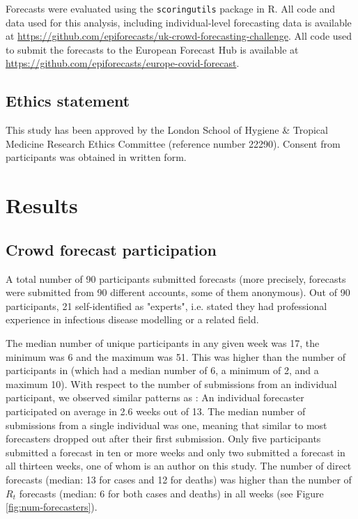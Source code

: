 \documentclass[10pt,a4paper,twocolumn]{article}
\begin{document}
Forecasts were evaluated using the \texttt{scoringutils} \citep{bosseEvaluatingForecastsScoringutils2022} package in \textsf{R}. All code and data used for this analysis, including individual-level forecasting data is available at \url{https://github.com/epiforecasts/uk-crowd-forecasting-challenge}. All code used to submit the forecasts to the European Forecast Hub is available at \url{https://github.com/epiforecasts/europe-covid-forecast}. 

\subsection*{Ethics statement}
This study has been approved by the London School of Hygiene \& Tropical Medicine Research Ethics Committee (reference number 22290). Consent from participants was obtained in written form.



\section*{Results}

\subsection*{Crowd forecast participation}

A total number of 90 participants submitted forecasts (more precisely, forecasts were submitted from 90 different accounts, some of them anonymous). Out of 90 participants, 21 self-identified as "experts", i.e. stated they had professional experience in infectious disease modelling or a related field. 

The median number of unique participants in any given week was 17, the minimum was 6 and the maximum was 51. This was higher than the number of participants in \cite{bosseComparingHumanModelbased2022} (which had a median number of 6, a minimum of 2, and a maximum 10). With respect to the number of submissions from an individual participant, we observed similar patterns as \cite{bosseComparingHumanModelbased2022}: An individual forecaster participated on average in 2.6 weeks out of 13. The median number of submissions from a single individual was one, meaning that similar to \citep{bosseComparingHumanModelbased2022} most forecasters dropped out after their first submission. Only five participants submitted a forecast in ten or more weeks and only two submitted a forecast in all thirteen weeks, one of whom is an author on this study. The number of direct forecasts (median: 13 for cases and 12 for deaths) was higher than the number of $R_t$ forecasts (median: 6 for both cases and deaths) in all weeks (see Figure \ref{fig:num-forecasters}). 
\end{document}
